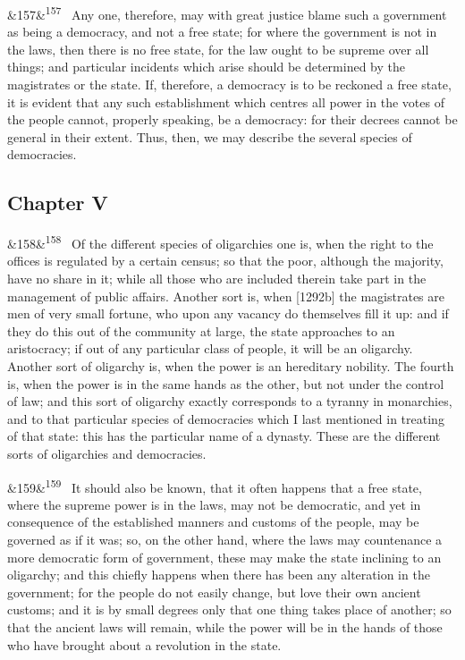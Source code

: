 \documentclass[12pt]{article}
\newcommand{\para}[1][]{\par\noindent\ifx&#1&\else\textsuperscript{\footnotesize #1}~\fi}
\begin{document}
\para[157] Any one, therefore, may with great justice blame such a government as being a democracy, and not a free state; for where the government is not in the laws, then there is no free state, for the law ought to be supreme over all things; and particular incidents which arise should be determined by the magistrates or the state. If, therefore, a democracy is to be reckoned a free state, it is evident that any such establishment which centres all power in the votes of the people cannot, properly speaking, be a democracy: for their decrees cannot be general in their extent. Thus, then, we may describe the several species of democracies.

\subsection*{Chapter V}

\para[158] Of the different species of oligarchies one is, when the right to the offices is regulated by a certain census; so that the poor, although the majority, have no share in it; while all those who are included therein take part in the management of public affairs. Another sort is, when [1292b] the magistrates are men of very small fortune, who upon any vacancy do themselves fill it up: and if they do this out of the community at large, the state approaches to an aristocracy; if out of any particular class of people, it will be an oligarchy. Another sort of oligarchy is, when the power is an hereditary nobility. The fourth is, when the power is in the same hands as the other, but not under the control of law; and this sort of oligarchy exactly corresponds to a tyranny in monarchies, and to that particular species of democracies which I last mentioned in treating of that state: this has the particular name of a dynasty. These are the different sorts of oligarchies and democracies.

\para[159] It should also be known, that it often happens that a free state, where the supreme power is in the laws, may not be democratic, and yet in consequence of the established manners and customs of the people, may be governed as if it was; so, on the other hand, where the laws may countenance a more democratic form of government, these may make the state inclining to an oligarchy; and this chiefly happens when there has been any alteration in the government; for the people do not easily change, but love their own ancient customs; and it is by small degrees only that one thing takes place of another; so that the ancient laws will remain, while the power will be in the hands of those who have brought about a revolution in the state.
\end{document}
